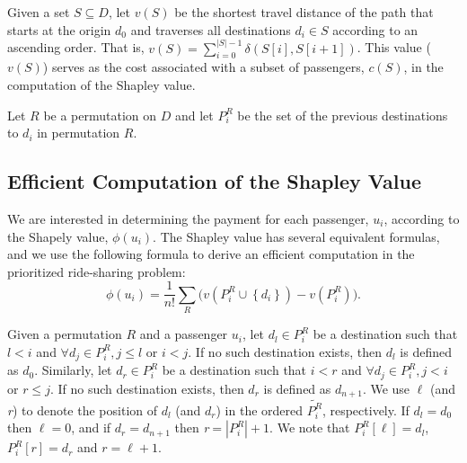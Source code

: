 \documentclass[sigconf]{aamas}
\begin{document}
Given a set $S \subseteq D$, let $v(S)$ be the shortest travel distance of the path that starts at the origin $d_0$ and traverses all destinations ${d_i} \in S$ according to an ascending order. That is, $v(S) = \sum\limits_{i=0}^{|S|-1} \delta(S[i],S[i+1])$. This value ($v(S)$) serves as the cost associated with a subset of passengers, $c(S)$, in the computation of the Shapley value.

Let $R$ be a permutation on $D$ and let $P^{R}_{i}$ be the set of the previous destinations to $d_i$ in permutation $R$.

\subsection{Efficient Computation of the Shapley Value}
We are interested in determining the payment for each passenger, $u_i$, according to the Shapely value, $\phi(u_i)$. The Shapley value has several equivalent formulas, and we use the following formula to derive an efficient computation in the prioritized ride-sharing problem: 
\[
\phi(u_i)={\frac {1}{n!}}\sum _{R}\bigg(v(P_{i}^{R}\cup \left\{d_i\right\})-v(P_{i}^{R})\bigg).
\]

Given a permutation $R$ and a passenger $u_i$, let $d_l \in P_{i}^{R}$ be a destination such that $l < i$ and $\forall d_j \in  P_{i}^{R}, j \leq l$ or $i < j$.
If no such destination exists, then $d_l$ is defined as $d_0$.
Similarly, let $d_r \in P_{i}^{R}$ be a destination such that $i < r$ and $\forall d_j \in  P_{i}^{R}, j < i$ or $r \leq j$.
If no such destination exists, then $d_r$ is defined as $d_{n+1}$.
We use $\ell$ (and \textit{r}) to denote the position of $d_l$ (and $d_r$) in the ordered $\tilde{P_{i}^{R}}$, respectively. If $d_l = d_0$ then $\ell=0$, and if $d_r=d_{n+1}$ then \textit{r}$=|P^{R}_{i}|+1$. We note that $P_{i}^{R}[\ell] = d_l$, $P_{i}^{R}[\textit{r}] = d_r$ and $\textit{r} = \ell+1$.

\end{document}
